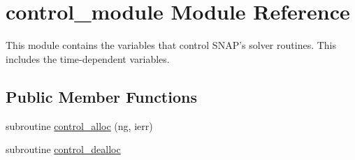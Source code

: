\hypertarget{classcontrol__module}{\section{control\-\_\-module Module Reference}
\label{classcontrol__module}
}


This module contains the variables that control S\-N\-A\-P's solver routines. This includes the time-\/dependent variables.  


\subsection*{Public Member Functions}
\begin{DoxyCompactItemize}
\item 
subroutine \hyperlink{classcontrol__module_ac6bb07f4107c0d12f193aebfb73e233f}{control\-\_\-alloc} (ng, ierr)
\item 
subroutine \hyperlink{classcontrol__module_a2f968e7fae2c9dab97d81d4e8db154c8}{control\-\_\-dealloc}
\end{DoxyCompactItemize}
